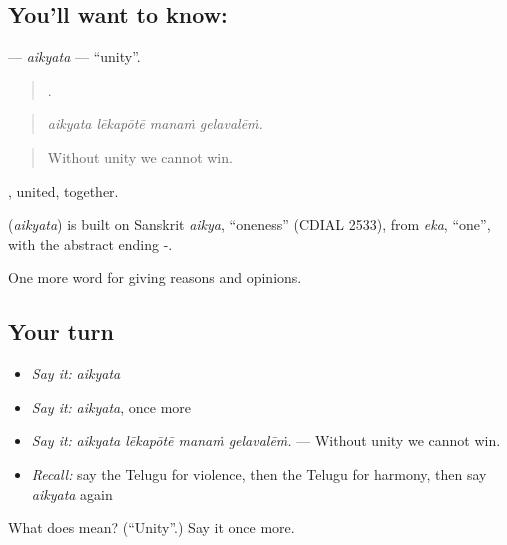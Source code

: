 \subsection*{You'll want to know: }
\textbf{} — \emph{aikyata} — \textquotedblleft{}unity\textquotedblright{}.

\begin{quote}
   .
\end{quote}

\begin{quote}
\emph{aikyata lēkapōtē manaṁ gelavalēṁ.}
\end{quote}

\begin{quote}
Without unity we cannot win.
\end{quote}

, united, together.

\begin{cousinweb}
\textbf{} (\emph{aikyata}) is built on Sanskrit \emph{aikya}, \textquotedblleft{}oneness\textquotedblright{} (CDIAL 2533), from \emph{eka}, \textquotedblleft{}one\textquotedblright{}, with the abstract ending -.
\end{cousinweb}

\begin{grammarlens}[title={What you've built}]
One more word for giving reasons and opinions.
\end{grammarlens}

\subsection*{Your turn}
\begin{itemize}
\raggedright
  \item \emph{Say it:} \emph{aikyata}
  \item \emph{Say it:} \emph{aikyata}, once more
  \item \emph{Say it:} \emph{aikyata lēkapōtē manaṁ gelavalēṁ.} — Without unity we cannot win.
  \item \emph{Recall:} say the Telugu for violence, then the Telugu for harmony, then say \emph{aikyata} again
\end{itemize}

\begin{tcolorbox}[breakable,colback=teal!4,colframe=teal!35!black,title={Before you move on}]
What does  mean? (\textquotedblleft{}Unity\textquotedblright{}.) Say it once more.
\end{tcolorbox}
